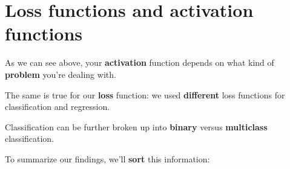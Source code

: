         
    
        
    
\pagebreak
\section{Loss functions and activation functions}

    As we can see above, your \textbf{activation} function depends on what kind of \textbf{problem} you're dealing with.
    
    The same is true for our \textbf{loss} function: we used \textbf{different} loss functions for classification and regression.
    
    Classification can be further broken up into \textbf{binary} versus \textbf{multiclass} classification.
    
    To summarize our findings, we'll \textbf{sort} this information:\\
    
